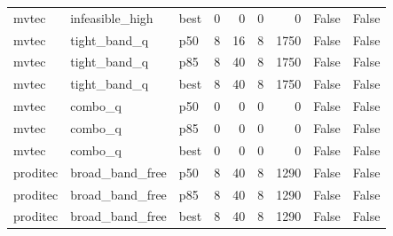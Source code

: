 \begin{tabular}{lllrrrrll}
   mvtec &      infeasible\_high &   best &                   0 &                 0 &                    0 &                            0 &                                        False &                                False \\
   mvtec &         tight\_band\_q &    p50 &                   8 &                16 &                    8 &                         1750 &                                        False &                                False \\
   mvtec &         tight\_band\_q &    p85 &                   8 &                40 &                    8 &                         1750 &                                        False &                                False \\
   mvtec &         tight\_band\_q &   best &                   8 &                40 &                    8 &                         1750 &                                        False &                                False \\
   mvtec &              combo\_q &    p50 &                   0 &                 0 &                    0 &                            0 &                                        False &                                False \\
   mvtec &              combo\_q &    p85 &                   0 &                 0 &                    0 &                            0 &                                        False &                                False \\
   mvtec &              combo\_q &   best &                   0 &                 0 &                    0 &                            0 &                                        False &                                False \\
proditec &      broad\_band\_free &    p50 &                   8 &                40 &                    8 &                         1290 &                                        False &                                False \\
proditec &      broad\_band\_free &    p85 &                   8 &                40 &                    8 &                         1290 &                                        False &                                False \\
proditec &      broad\_band\_free &   best &                   8 &                40 &                    8 &                         1290 &                                        False &                                False \\

\end{tabular}
